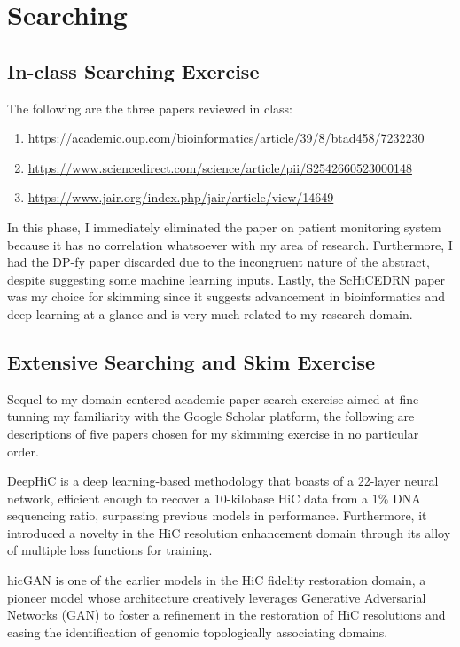 \section{Searching}
\subsection{In-class Searching Exercise}
The following are the three papers reviewed in class:
\begin{enumerate}
    \item \url{https://academic.oup.com/bioinformatics/article/39/8/btad458/7232230}
    \item \url{https://www.sciencedirect.com/science/article/pii/S2542660523000148}
    \item \url{https://www.jair.org/index.php/jair/article/view/14649}
\end{enumerate}

In this phase, I immediately eliminated the paper on patient monitoring system because it has no correlation whatsoever with my area of research. Furthermore, I had the DP-fy paper discarded due to the incongruent nature of the abstract, despite suggesting some machine learning inputs. Lastly, the ScHiCEDRN paper was my choice for skimming since it suggests advancement in bioinformatics and deep learning at a glance and is very much related to my research domain.

\subsection{Extensive Searching and Skim Exercise}
Sequel to my domain-centered academic paper search exercise aimed at fine-tunning my familiarity with the Google Scholar platform, the following are descriptions of five papers chosen for my skimming exercise in no particular order.

DeepHiC \cite{hong_deephic_2020} is a deep learning-based methodology that boasts of a 22-layer neural network, efficient enough to recover a 10-kilobase HiC data from a $1\%$ DNA sequencing ratio, surpassing previous models in performance. Furthermore, it introduced a novelty in the HiC resolution enhancement domain through its alloy of multiple loss functions for training.

hicGAN\cite{liu_hicgan_2019} is one of the earlier models in the HiC fidelity restoration domain, a pioneer model whose architecture creatively leverages Generative Adversarial Networks (GAN) to foster a refinement in the restoration of HiC resolutions and easing the identification of genomic topologically associating domains.

